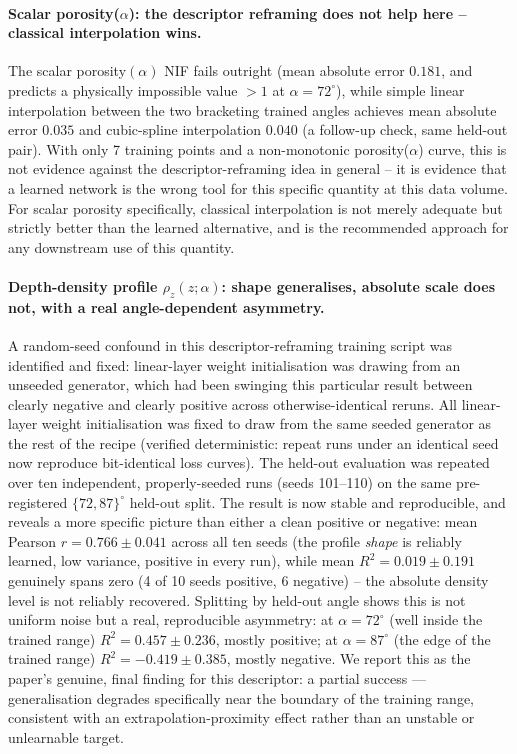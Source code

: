 \documentclass[aip,amsmath,amssymb,reprint]{revtex4-1}
\renewcommand{\ang}{\ensuremath{\alpha}} %
\begin{document}
\paragraph{Scalar porosity($\ang$): the descriptor reframing does not help here -- classical interpolation wins.}
The scalar porosity$(\ang)$ NIF fails outright (mean absolute error
$0.181$, and predicts a physically impossible value $>1$ at
$\ang=72^{\circ}$), while simple linear interpolation between the two
bracketing trained angles achieves mean absolute error $0.035$ and
cubic-spline interpolation $0.040$ (a follow-up check, same
held-out pair). With only 7 training points and a
non-monotonic porosity($\ang$) curve, this is not evidence against the
descriptor-reframing idea in general -- it is evidence that a learned
network is the wrong tool for this specific quantity at this data
volume. For scalar porosity specifically, classical interpolation is
not merely adequate but strictly better than the learned alternative,
and is the recommended approach for any downstream use of this
quantity.

\paragraph{Depth-density profile $\rho_z(z;\ang)$: shape generalises, absolute scale does not, with a real angle-dependent asymmetry.}
A random-seed confound in this descriptor-reframing training script
was identified and fixed: linear-layer weight initialisation was
drawing from an unseeded generator, which had been swinging this
particular result between clearly negative and clearly positive
across otherwise-identical reruns. All linear-layer weight
initialisation was fixed to draw from the same seeded generator as
the rest of the recipe (verified deterministic: repeat runs under an
identical seed now reproduce bit-identical loss curves). The
held-out evaluation was repeated over ten independent, properly-seeded
runs (seeds 101--110) on the same pre-registered $\{72,87\}^{\circ}$
held-out split. The result is now stable and reproducible, and reveals
a more specific picture than either a clean positive or negative: mean
Pearson $r=0.766\pm0.041$ across all ten seeds (the profile
\emph{shape} is reliably learned, low variance, positive in every
run), while mean $R^2=0.019\pm0.191$ genuinely spans zero (4 of 10
seeds positive, 6 negative) -- the absolute density level is not
reliably recovered. Splitting by held-out angle shows this is not
uniform noise but a real, reproducible asymmetry: at
$\ang=72^{\circ}$ (well inside the trained range) $R^2=0.457\pm0.236$,
mostly positive; at $\ang=87^{\circ}$ (the edge of the trained range)
$R^2=-0.419\pm0.385$, mostly negative. We report this as the
paper's genuine, final finding for this descriptor: a partial success
--- generalisation degrades specifically near the boundary of the
training range, consistent with an extrapolation-proximity effect
rather than an unstable or unlearnable target.
\end{document}
